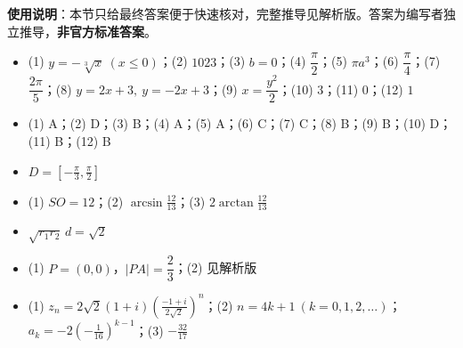 
\begin{gknotice}
\textbf{使用说明}：本节只给最终答案便于快速核对，完整推导见解析版。答案为编写者独立推导，\textbf{非官方标准答案}。
\end{gknotice}

\begin{itemize}[leftmargin=2.6em]
  \item[\textbf{1.}] (1) $y=-\sqrt[3]{x}\ (x\leq0)$；(2) $1023$；(3) $b=0$；(4) $\dfrac\pi2$；(5) $\pi a^3$；(6) $\dfrac\pi4$；(7) $\dfrac{2\pi}{5}$；(8) $y=2x+3,\ y=-2x+3$；(9) $x=\dfrac{y^2}{2}$；(10) $3$；(11) $0$；(12) $1$
  \item[\textbf{2.}] (1) A；(2) D；(3) B；(4) A；(5) A；(6) C；(7) C；(8) B；(9) B；(10) D；(11) B；(12) B
  \item[\textbf{3.}] $\displaystyle D=\left[-\frac\pi3,\frac\pi2\right]$
  \item[\textbf{4.}] (1) $SO=12$；(2) $\displaystyle\arcsin\frac{12}{13}$；(3) $\displaystyle2\arctan\frac{12}{13}$
  \item[\textbf{5.}] $\displaystyle\sqrt{r_1r_2}\,d=\sqrt2$
  \item[\textbf{6.}] (1) $P=(0,0)$，$|PA|=\dfrac23$；(2) 见解析版
  \item[\textbf{7.}] (1) $\displaystyle z_n=2\sqrt2(1+i)\left(\frac{-1+i}{2\sqrt2}\right)^n$；(2) $n=4k+1\ (k=0,1,2,\ldots)$；$\displaystyle a_k=-2\left(-\frac1{16}\right)^{k-1}$；(3) $\displaystyle-\frac{32}{17}$
\end{itemize}
